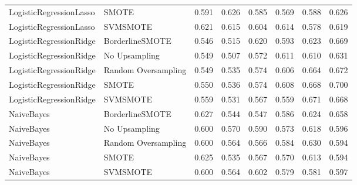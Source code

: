 \begin{tabular}{llllllll}
     LogisticRegressionLasso &               SMOTE & 0.591 &                     0.626 &                 0.585 &                  0.569 &                                   0.588 &     0.626 \\
     LogisticRegressionLasso &            SVMSMOTE & 0.621 &                     0.615 &                 0.604 &                  0.614 &                                   0.578 &     0.619 \\
     LogisticRegressionRidge &     BorderlineSMOTE & 0.546 &                     0.515 &                 0.620 &                  0.593 &                                   0.623 &     0.669 \\
     LogisticRegressionRidge &       No Upsampling & 0.549 &                     0.507 &                 0.572 &                  0.611 &                                   0.610 &     0.631 \\
     LogisticRegressionRidge & Random Oversampling & 0.549 &                     0.535 &                 0.574 &                  0.606 &                                   0.664 &     0.672 \\
     LogisticRegressionRidge &               SMOTE & 0.550 &                     0.536 &                 0.574 &                  0.608 &                                   0.668 &     0.700 \\
     LogisticRegressionRidge &            SVMSMOTE & 0.559 &                     0.531 &                 0.567 &                  0.559 &                                   0.671 &     0.668 \\
                  NaiveBayes &     BorderlineSMOTE & 0.627 &                     0.544 &                 0.547 &                  0.586 &                                   0.624 &     0.658 \\
                  NaiveBayes &       No Upsampling & 0.600 &                     0.570 &                 0.590 &                  0.573 &                                   0.618 &     0.596 \\
                  NaiveBayes & Random Oversampling & 0.600 &                     0.564 &                 0.566 &                  0.584 &                                   0.630 &     0.594 \\
                  NaiveBayes &               SMOTE & 0.625 &                     0.535 &                 0.567 &                  0.570 &                                   0.613 &     0.594 \\
                  NaiveBayes &            SVMSMOTE & 0.600 &                     0.564 &                 0.602 &                  0.579 &                                   0.581 &     0.597 \\

\end{tabular}
